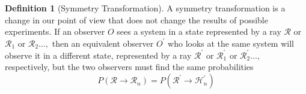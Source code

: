\documentclass[a4paper]{tufte-handout}
\theoremstyle{definition}
\newtheorem{definition}{Definition}
\begin{document}
\begin{definition}[Symmetry Transformation]
  A symmetry transformation is a change in our point of view that does not change the results of possible experiments.
  If an observer $O$ sees a system in a state represented by a ray $\mathscr{R}$ or $\mathscr{R}_{1}$ or $\mathscr{R}_{2} \ldots,$ then an equivalent observer $O^{\prime}$ who looks at the same system will observe it in a different state, represented by a ray $\mathscr{R}^{\prime}$ or $\mathscr{R}_{1}^{\prime}$ or $\mathscr{R}_{2}^{\prime} \ldots,$ respectively, but the two observers must find the same probabilities
$$
P\left(\mathscr{R} \rightarrow \mathscr{R}_{n}\right)=P\left(\mathscr{R}^{\prime} \rightarrow \mathscr{H}_{n}^{\prime}\right)
$$
\end{definition}






\end{document}

